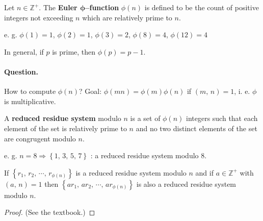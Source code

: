 \begin{definition}
    Let $n \in \mathbb{Z}^+$. The \textbf{Euler $\mathbf{\phi}$--function}
    $\phi\left(n\right)$ is defined to be the count of positive 
    integers not exceeding $n$ which are relatively prime to $n$.
\end{definition}

e. g. $\phi\left(1\right)=1$, $\phi\left(2\right)=1$, $\phi\left(3\right)=2$, 
$\phi\left(8\right)=4$, $\phi\left(12\right)=4$

In general, if $p$ is prime, then $\phi\left(p\right) = p-1$.

\paragraph{Question.} How to compute $\phi\left(n\right)$?
Goal: $\phi\left(mn\right)=\phi\left(m\right)\phi\left(n\right)$
if $\left(m,\,n\right)=1$, i. e. $\phi$ is multiplicative.

\begin{definition}
    A \textbf{reduced residue system} modulo $n$ is 
    a set of $\phi\left(n\right)$ integers such that each element of
    the set is relatively prime to $n$ and no two distinct elements
    of the set are congrugent modulo $n$.
\end{definition}

e. g. $n=8\Rightarrow\left\{1,\,3,\,5,\,7\right\}$ : a reduced residue
system modulo 8.

\begin{lemma}
    If $\left\{r_1,\,r_2,\,\cdots,\,r_{\phi\left(n\right)}\right\}$ is a reduced
    residue system modulo $n$ and if $a\in\mathbb{Z}^+$ with $\left(a,\,n\right)=1$
    then $\left\{ar_1,\,ar_2,\,\cdots,\,ar_{\phi\left(n\right)}\right\}$
    is also a reduced residue system modulo $n$.
\end{lemma}
\begin{proof}
    (See the textbook.)
\end{proof}

